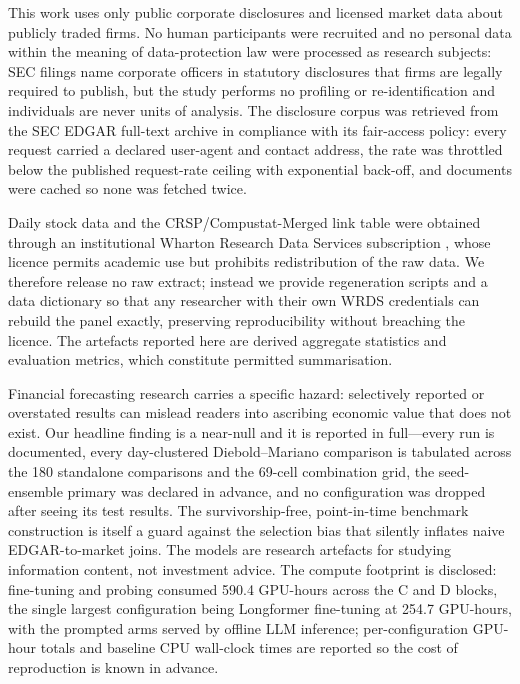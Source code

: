 This work uses only public corporate disclosures and licensed market data about publicly traded firms. No human participants were recruited and no personal data within the meaning of data-protection law were processed as research subjects: SEC filings name corporate officers in statutory disclosures that firms are legally required to publish, but the study performs no profiling or re-identification and individuals are never units of analysis. The disclosure corpus was retrieved from the SEC EDGAR full-text archive \citep{sec2024edgar} in compliance with its fair-access policy: every request carried a declared user-agent and contact address, the rate was throttled below the published request-rate ceiling with exponential back-off, and documents were cached so none was fetched twice.

Daily stock data and the CRSP/Compustat-Merged link table were obtained through an institutional Wharton Research Data Services subscription \citep{crsp2026data}, whose licence permits academic use but prohibits redistribution of the raw data. We therefore release no raw extract; instead we provide regeneration scripts and a data dictionary so that any researcher with their own WRDS credentials can rebuild the panel exactly, preserving reproducibility without breaching the licence. The artefacts reported here are derived aggregate statistics and evaluation metrics, which constitute permitted summarisation.

Financial forecasting research carries a specific hazard: selectively reported or overstated results can mislead readers into ascribing economic value that does not exist. Our headline finding is a near-null and it is reported in full---every run is documented, every day-clustered Diebold--Mariano comparison is tabulated across the 180 standalone comparisons and the 69-cell combination grid, the seed-ensemble primary was declared in advance, and no configuration was dropped after seeing its test results. The survivorship-free, point-in-time benchmark construction is itself a guard against the selection bias that silently inflates naive EDGAR-to-market joins. The models are research artefacts for studying information content, not investment advice. The compute footprint is disclosed: fine-tuning and probing consumed 590.4 GPU-hours across the C and D blocks, the single largest configuration being Longformer fine-tuning at 254.7 GPU-hours, with the prompted arms served by offline LLM inference; per-configuration GPU-hour totals and baseline CPU wall-clock times are reported so the cost of reproduction is known in advance.
